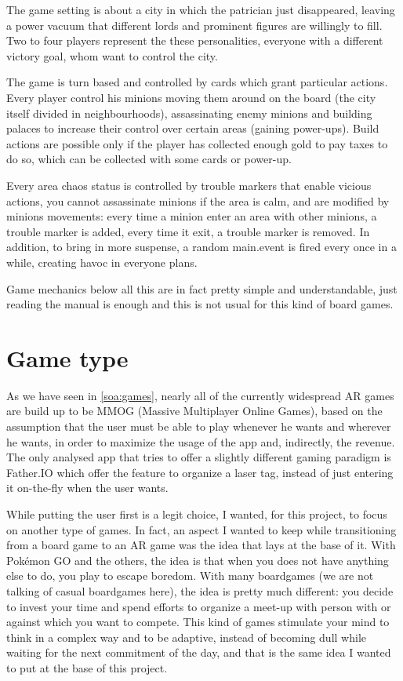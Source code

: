 		The game setting is about a city in which the patrician just disappeared, leaving a power vacuum that different lords and prominent figures are willingly to fill.
		Two to four players represent the these personalities, everyone with a different victory goal, whom want to control the city.
		
		The game is turn based and controlled by cards which grant particular actions.
		Every player control his minions moving them around on the board (the city itself divided in neighbourhoods), assassinating enemy minions and building palaces to increase their control over certain areas (gaining power-ups).
		Build actions are possible only if the player has collected enough gold to pay taxes to do so, which can be collected with some cards or power-up.
	
		Every area chaos status is controlled by trouble markers that enable vicious actions, you cannot assassinate minions if the area is calm, and are modified by minions movements: every time a minion enter an area with other minions, a trouble marker is added, every time it exit, a trouble marker is removed.
		In addition, to bring in more suspense, a random main.event is fired every once in a while, creating havoc in everyone plans.
		
		Game mechanics below all this are in fact pretty simple and understandable, just reading the manual is enough and this is not usual for this kind of board games.
	
	\section{Game type}
	
		As we have seen in \autoref{soa:games}, nearly all of the currently widespread AR games are build up to be MMOG (Massive Multiplayer Online Games), based on the assumption that the user must be able to play whenever he wants and wherever he wants, in order to maximize the usage of the app and, indirectly, the revenue.
		The only analysed app that tries to offer a slightly different gaming paradigm is Father.IO which offer the feature to organize a laser tag, instead of just entering it on-the-fly when the user wants.
		
		While putting the user first is a legit choice, I wanted, for this project, to focus on another type of games.
		In fact, an aspect I wanted to keep while transitioning from a board game to an AR game was the idea that lays at the base of it.
		With Pokémon GO and the others, the idea is that when you does not have anything else to do, you play to escape boredom.
		With many boardgames (we are not talking of casual boardgames here), the idea is pretty much different: you decide to invest your time and spend efforts to organize a meet-up with person with or against which you want to compete.
		This kind of games stimulate your mind to think in a complex way and to be adaptive, instead of becoming dull while waiting for the next commitment of the day, and that is the same idea I wanted to put at the base of this project.
		
